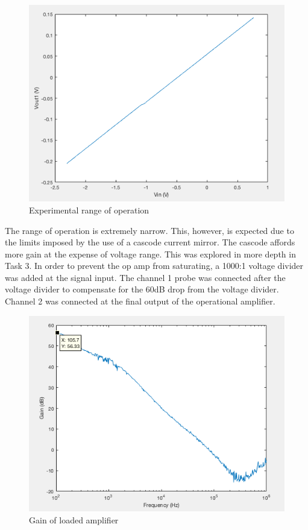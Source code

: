 		
		\begin{figure}[H]
			\begin{center}
				\includegraphics[scale=.40]{ExperimentalImplementation/VTC.png}
				\caption{Experimental range of operation}
				\label{fig:vtc}
			\end{center}
		\end{figure}
		
		The range of operation is extremely narrow. This, however, is expected due to the limits imposed by the use of a cascode current mirror. The cascode affords more gain at the expense of voltage range. This was explored in more depth in Task 3. In order to prevent the op amp from saturating, a 1000:1 voltage divider was added at the signal input. The channel 1 probe was connected after the voltage divider to compensate for the 60dB drop from the voltage divider. Channel 2 was connected at the final output of the operational amplifier. 
		
				\begin{figure}[H]
			\begin{center}
				\includegraphics[scale=.40]{ExperimentalImplementation/gainwithload.png}
				\caption{Gain of loaded amplifier}
				\label{fig:gainwithload}
			\end{center}
		\end{figure}
	
